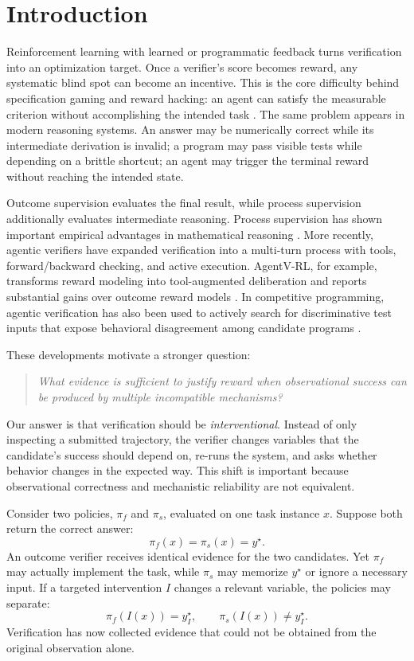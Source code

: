 \documentclass[10pt]{article}
\begin{document}
\section{Introduction}

Reinforcement learning with learned or programmatic feedback turns verification into an optimization target. Once a verifier's score becomes reward, any systematic blind spot can become an incentive. This is the core difficulty behind specification gaming and reward hacking: an agent can satisfy the measurable criterion without accomplishing the intended task \citep{everitt2017corrupted,deepmind2020specification}. The same problem appears in modern reasoning systems. An answer may be numerically correct while its intermediate derivation is invalid; a program may pass visible tests while depending on a brittle shortcut; an agent may trigger the terminal reward without reaching the intended state.

Outcome supervision evaluates the final result, while process supervision additionally evaluates intermediate reasoning. Process supervision has shown important empirical advantages in mathematical reasoning \citep{lightman2023verify}. More recently, agentic verifiers have expanded verification into a multi-turn process with tools, forward/backward checking, and active execution. AgentV-RL, for example, transforms reward modeling into tool-augmented deliberation and reports substantial gains over outcome reward models \citep{zhang2026agentv}. In competitive programming, agentic verification has also been used to actively search for discriminative test inputs that expose behavioral disagreement among candidate programs \citep{ma2026coding}.

These developments motivate a stronger question:

\begin{quote}
\emph{What evidence is sufficient to justify reward when observational success can be produced by multiple incompatible mechanisms?}
\end{quote}

Our answer is that verification should be \emph{interventional}. Instead of only inspecting a submitted trajectory, the verifier changes variables that the candidate's success should depend on, re-runs the system, and asks whether behavior changes in the expected way. This shift is important because observational correctness and mechanistic reliability are not equivalent.

Consider two policies, $\pi_f$ and $\pi_s$, evaluated on one task instance $x$. Suppose both return the correct answer:
\[
\pi_f(x)=\pi_s(x)=y^\star.
\]
An outcome verifier receives identical evidence for the two candidates. Yet $\pi_f$ may actually implement the task, while $\pi_s$ may memorize $y^\star$ or ignore a necessary input. If a targeted intervention $I$ changes a relevant variable, the policies may separate:
\[
\pi_f(I(x))=y^\star_I,
\qquad
\pi_s(I(x))\neq y^\star_I.
\]
Verification has now collected evidence that could not be obtained from the original observation alone.
\end{document}
